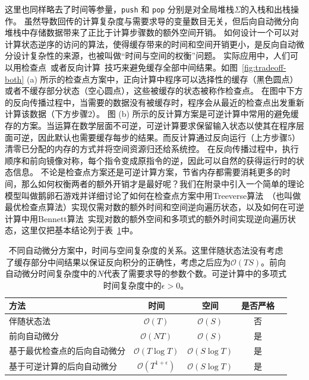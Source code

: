 \documentclass[A4,twoside,UTF8]{ctexart}
\newcommand{\bigO}{{\mathcal{O}}}
\begin{document}
这里也同样略去了时间等参量，\texttt{push} 和 \texttt{pop} 分别是对全局堆栈$\Sigma$的入栈和出栈操作。
虽然导数回传的计算复杂度与需要求导的变量数目无关，但后向自动微分向堆栈中存储数据带来了正比于计算步骤数的额外空间开销。
如何设计一个可以对计算状态逆序的访问的算法，使得缓存带来的时间和空间开销更小，是反向自动微分设计复杂性的来源，也被叫做“时间与空间的权衡”问题。
实际应用中，人们可以用检查点~\cite{Griewank1992}或者反向计算~\cite{Liu2020b}技巧来避免缓存全部中间结果。如图~\ref{fig:tradeoff-both} (a) 所示的检查点方案中，正向计算中程序可以选择性的缓存（黑色圆点）或者不缓存部分状态（空心圆点），这些被缓存的状态被称作检查点。
在图中下方的反向传播过程中，当需要的数据没有被缓存时，程序会从最近的检查点出发重新计算该数据（下方步骤2）。
图 (b) 所示的反计算方案是可逆计算中常用的避免缓存的方案。当运算在数学层面不可逆，可逆计算要求保留输入状态以使其在程序层面可逆，因此默认也需要缓存每步的结果。而反计算通过反向运行（上方步骤5）清零已分配的内存的方式并将空间资源归还给系统控。
在反向传播过程中，执行顺序和前向镜像对称，每个指令变成原指令的逆，因此可以自然的获得运行时的状态信息。
不论是检查点方案还是可逆计算方案，节省内存都需要消耗更多的时间，那么如何权衡两者的额外开销才是最好呢？我们在附录中引入一个简单的理论模型叫做鹅卵石游戏并详细讨论了如何在检查点方案中用Treeverse算法~\cite{Griewank1992}（也叫做最优检查点算法）实现仅需对数的额外时间和空间逆向遍历状态，以及如何在可逆计算中用Bennett算法~\cite{Levine1990}实现对数的额外空间和多项式的额外时间实现逆向遍历状态，这里仅把基本结论列于表~\ref{tbl:complexity}中。

\begin{table}\centering
    \begin{tabularx}{0.8\textwidth}{Xcccc}\toprule
        \textbf{方法} & 时间 & 空间 & 是否严格 \\
        \hline
        伴随状态法                    &  $\bigO(T)$          & $\bigO(S)$ & 否 \\
        前向自动微分                 &  $\bigO(NT)$         & $\bigO(S)$ & 是 \\
        基于最优检查点的后向自动微分     &  $\bigO(T\log T)$    & $\bigO(S\log T)$  & 是\\
        基于可逆计算的后向自动微分   &  $\bigO(T^{1+\epsilon})$ & $\bigO(S\log T)$  & 是 \\
        \bottomrule
    \end{tabularx}
    \caption{不同自动微分方案中，时间与空间复杂度的关系。这里伴随状态法没有考虑了缓存部分中间结果以保证反向积分的正确性，考虑之后应为$\bigO(TS)$。前向自动微分时间复杂度中的$N$代表了需要求导的参数个数。可逆计算中的多项式时间复杂度中的$\epsilon > 0$。} \label{tbl:complexity}
\end{table}
\end{document}
